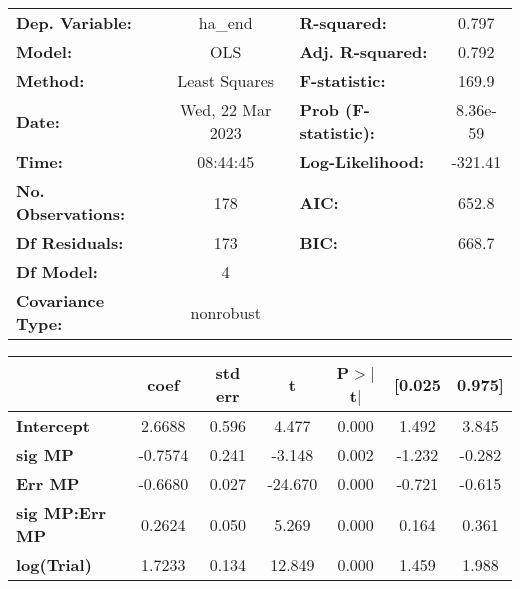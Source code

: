 \begin{center}
\begin{tabular}{lclc}
\toprule
\textbf{Dep. Variable:}    &     ha\_end      & \textbf{  R-squared:         } &    0.797  \\
\textbf{Model:}            &       OLS        & \textbf{  Adj. R-squared:    } &    0.792  \\
\textbf{Method:}           &  Least Squares   & \textbf{  F-statistic:       } &    169.9  \\
\textbf{Date:}             & Wed, 22 Mar 2023 & \textbf{  Prob (F-statistic):} & 8.36e-59  \\
\textbf{Time:}             &     08:44:45     & \textbf{  Log-Likelihood:    } &  -321.41  \\
\textbf{No. Observations:} &         178      & \textbf{  AIC:               } &    652.8  \\
\textbf{Df Residuals:}     &         173      & \textbf{  BIC:               } &    668.7  \\
\textbf{Df Model:}         &           4      & \textbf{                     } &           \\
\textbf{Covariance Type:}  &    nonrobust     & \textbf{                     } &           \\
\bottomrule
\end{tabular}
\end{center}\begin{center}
\begin{tabular}{lcccccc}
\toprule
                       & \textbf{coef} & \textbf{std err} & \textbf{t} & \textbf{P$> |$t$|$} & \textbf{[0.025} & \textbf{0.975]}  \\
\midrule
\textbf{Intercept}     &       2.6688  &        0.596     &     4.477  &         0.000        &        1.492    &        3.845     \\
\textbf{sig MP}        &      -0.7574  &        0.241     &    -3.148  &         0.002        &       -1.232    &       -0.282     \\
\textbf{Err MP}        &      -0.6680  &        0.027     &   -24.670  &         0.000        &       -0.721    &       -0.615     \\
\textbf{sig MP:Err MP} &       0.2624  &        0.050     &     5.269  &         0.000        &        0.164    &        0.361     \\
\textbf{log(Trial)}    &       1.7233  &        0.134     &    12.849  &         0.000        &        1.459    &        1.988     \\

\end{tabular}
\end{center}
